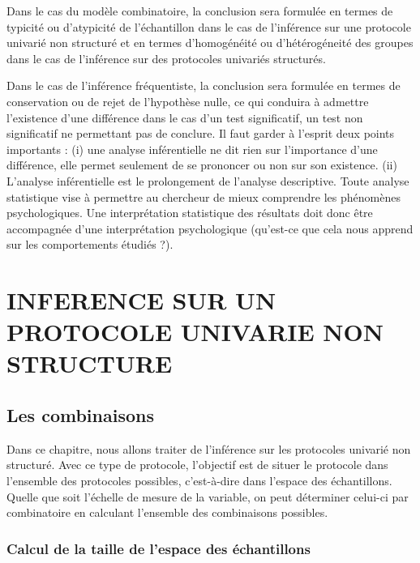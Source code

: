 \documentclass[]{book}
\theoremstyle{definition}
\theoremstyle{definition}
\theoremstyle{definition}
\theoremstyle{remark}
\begin{document}
Dans le cas du modèle combinatoire, la conclusion sera formulée en
termes de typicité ou d'atypicité de l'échantillon dans le cas de
l'inférence sur une protocole univarié non structuré et en termes
d'homogénéité ou d'hétérogéneité des groupes dans le cas de l'inférence
sur des protocoles univariés structurés.

Dans le cas de l'inférence fréquentiste, la conclusion sera formulée en
termes de conservation ou de rejet de l'hypothèse nulle, ce qui conduira
à admettre l'existence d'une différence dans le cas d'un test
significatif, un test non significatif ne permettant pas de conclure. Il
faut garder à l'esprit deux points importants : (i) une analyse
inférentielle ne dit rien sur l'importance d'une différence, elle permet
seulement de se prononcer ou non sur son existence. (ii) L'analyse
inférentielle est le prolongement de l'analyse descriptive. Toute
analyse statistique vise à permettre au chercheur de mieux comprendre
les phénomènes psychologiques. Une interprétation statistique des
résultats doit donc être accompagnée d'une interprétation psychologique
(qu'est-ce que cela nous apprend sur les comportements étudiés ?).

\hypertarget{inference-sur-un-protocole-univarie-non-structure}{%
\chapter{INFERENCE SUR UN PROTOCOLE UNIVARIE NON
STRUCTURE}\label{inference-sur-un-protocole-univarie-non-structure}}

\hypertarget{les-combinaisons}{%
\section{Les combinaisons}\label{les-combinaisons}}

Dans ce chapitre, nous allons traiter de l'inférence sur les protocoles
univarié non structuré. Avec ce type de protocole, l'objectif est de
situer le protocole dans l'ensemble des protocoles possibles,
c'est-à-dire dans l'espace des échantillons. Quelle que soit l'échelle
de mesure de la variable, on peut déterminer celui-ci par combinatoire
en calculant l'ensemble des combinaisons possibles.

\hypertarget{calcul-de-la-taille-de-lespace-des-echantillons}{%
\subsection{Calcul de la taille de l'espace des
échantillons}\label{calcul-de-la-taille-de-lespace-des-echantillons}}
\end{document}
